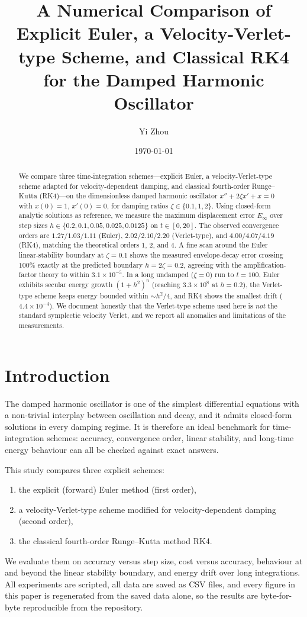 \documentclass[11pt,a4paper]{article}
\title{A Numerical Comparison of Explicit Euler, a Velocity-Verlet-type
Scheme, and Classical RK4 for the Damped Harmonic Oscillator}
\author{Yi Zhou}
\date{\today}
\begin{document}
\maketitle

\begin{abstract}
We compare three time-integration schemes---explicit Euler,
a velocity-Verlet-type scheme adapted for velocity-dependent damping,
and classical fourth-order Runge--Kutta (RK4)---on the dimensionless
damped harmonic oscillator $x''+2\zeta x'+x=0$ with $x(0)=1$, $x'(0)=0$,
for damping ratios $\zeta\in\{0.1,1,2\}$.
Using closed-form analytic solutions as reference, we measure the
maximum displacement error $E_\infty$ over step sizes
$h\in\{0.2,0.1,0.05,0.025,0.0125\}$ on $t\in[0,20]$.
The observed convergence orders are $1.27/1.03/1.11$ (Euler),
$2.02/2.10/2.20$ (Verlet-type), and $4.00/4.07/4.19$ (RK4),
matching the theoretical orders $1$, $2$, and $4$.
A fine scan around the Euler linear-stability boundary at $\zeta=0.1$
shows the measured envelope-decay error crossing $100\%$ exactly at the
predicted boundary $h=2\zeta=0.2$, agreeing with the amplification-factor
theory to within $3.1\times10^{-5}$.
In a long undamped ($\zeta=0$) run to $t=100$, Euler exhibits secular
energy growth $(1+h^2)^n$ (reaching $3.3\times10^8$ at $h=0.2$), the
Verlet-type scheme keeps energy bounded within $\sim h^2/4$, and RK4
shows the smallest drift ($4.4\times10^{-4}$).
We document honestly that the Verlet-type scheme used here is
\emph{not} the standard symplectic velocity Verlet, and we report all
anomalies and limitations of the measurements.
\end{abstract}

\section{Introduction}
The damped harmonic oscillator is one of the simplest differential
equations with a non-trivial interplay between oscillation and decay,
and it admits closed-form solutions in every damping regime. It is
therefore an ideal benchmark for time-integration schemes: accuracy,
convergence order, linear stability, and long-time energy behaviour can
all be checked against exact answers.

This study compares three explicit schemes:
\begin{enumerate}
\item the explicit (forward) Euler method (first order),
\item a velocity-Verlet-type scheme modified for velocity-dependent
damping (second order),
\item the classical fourth-order Runge--Kutta method RK4.
\end{enumerate}
We evaluate them on accuracy versus step size, cost versus accuracy,
behaviour at and beyond the linear stability boundary, and energy drift
over long integrations. All experiments are scripted, all data are
saved as CSV files, and every figure in this paper is regenerated from
the saved data alone, so the results are byte-for-byte reproducible from
the repository.
\end{document}
